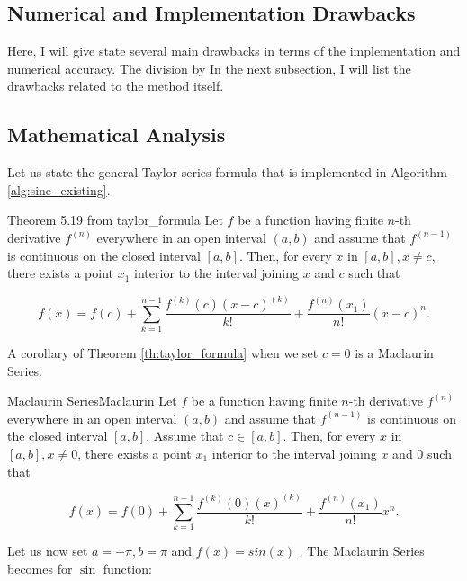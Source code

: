 \documentclass[12pt]{article}
\begin{document}


\subsection{Numerical and Implementation Drawbacks}
Here, I will give state several main drawbacks in terms of the implementation and numerical accuracy. The division by
In the next subsection, I will list the drawbacks related to the method itself.
\subsection{Mathematical Analysis}
Let us state the general Taylor series formula that is implemented in Algorithm \ref{alg:sine_existing}.
\begin{TheoremColor}{Theorem 5.19 from }{taylor_formula}
    Let $f$ be a function having finite $n$-th derivative $f^{(n)}$
    everywhere in an open interval $(a, b)$ and assume that  $f^{(n-1)}$ is continuous on the closed interval $[a, b]$. Then, for every $x$ in $[a, b], x\neq c$, there exists a point $x_1$ interior to the interval joining $x$ and $c$ such that

    \begin{equation*}
        f(x) = f(c) + \sum_{k=1}^{n-1} \frac{f^{(k)}(c)(x-c)^{(k)}}{k!} + \frac{f^{(n)}(x_1)}{n!} (x - c)^n.
    \end{equation*}
\end{TheoremColor}
A corollary of Theorem \ref{th:taylor_formula} when we set $c = 0$ is a Maclaurin Series.
\begin{CorollaryColor}{Maclaurin Series}{Maclaurin}
    Let $f$ be a function having finite $n$-th derivative $f^{(n)}$
    everywhere in an open interval $(a, b)$ and assume that  $f^{(n-1)}$ is continuous on the closed interval $[a, b]$. Assume that $c \in [a, b]$. Then, for every $x$ in $[a, b], x\neq 0$, there exists a point $x_1$ interior to the interval joining $x$ and $0$ such that

    \begin{equation*}
        f(x) = f(0) + \sum_{k=1}^{n-1} \frac{f^{(k)}(0)(x)^{(k)}}{k!} + \frac{f^{(n)}(x_1)}{n!} x^n.
    \end{equation*}
\end{CorollaryColor}
Let us now set $a = -\pi, b= \pi$ and $f(x) = sin(x)$ .
The Maclaurin Series becomes for $\sin$ function:
\end{document}
